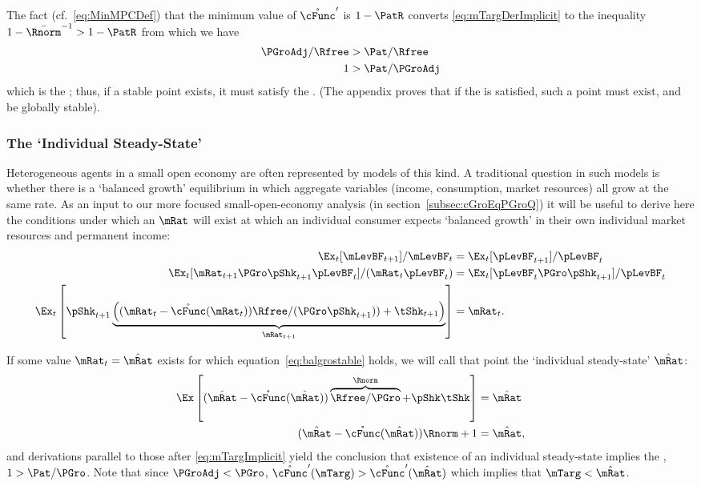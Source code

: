 \documentclass[BufferStockTheory]{subfiles}
\begin{document}
 The fact (cf.\ \eqref{eq:MinMPCDef}) that the minimum value of $\mathring{\cFunc}^{\prime}$ is $1-\PatR$ converts \eqref{eq:mTargDerImplicit} to the inequality $1-\bar{\Rnorm}^{-1} > 1-\PatR$ from which we have
 \begin{align}
      \PGroAdj/\Rfree & > \Pat/\Rfree \notag
\\    1 & > \Pat/\PGroAdj
 \end{align}
which is the {\GICNrm}; thus, if a stable point exists, it must satisfy the {\GICNrm}.  (The appendix proves that if the {\GICNrm} is satisfied, such a point must exist, and be globally stable).

 \hypertarget{The-Individual-Steady-State}{}
 \subsubsection{The `Individual Steady-State'}\label{subsubsec:mSteadyState}
 
Heterogeneous agents in a small open economy are often represented by models of this kind.  A traditional question in such models is whether there is a `balanced growth' equilibrium in which aggregate variables (income, consumption, market resources) all grow at the same rate. 
As an input to our more focused small-open-economy analysis (in section~\ref{subsec:cGroEqPGroQ}) it will be useful to derive here the conditions under which an $\mRat$ will exist at which an individual consumer expects `balanced growth' in their own individual market resources and permanent income:
  \begin{align}
  \Ex_{t}[\mLevBF_{t+1}]/\mLevBF_{t} & =\Ex_{t}[\pLevBF_{t+1}]/\pLevBF_{t} \notag
    \\  \Ex_{t}[\mRat_{t+1}\PGro\pShk_{t+1}\pLevBF_{t}]/(\mRat_{t}\pLevBF_{t}) & =\Ex_{t}[\pLevBF_{t}\PGro\pShk_{t+1}]/\pLevBF_{t} \notag
\\ \Ex_{t}\left[\pShk_{t+1}\underbrace{\left((\mRat_{t}-\mathring{\cFunc}(\mRat_{t}))\Rfree/(\PGro\pShk_{t+1}))+\tShk_{t+1}\right)}_{\mRat_{t+1}}\right] & = \mRat_{t} \label{eq:balgrostable}.  
\end{align}

\hypertarget{balgrostableSolve}{}
If some value $\mRat_{t}=\hat{\mRat}$ exists for which equation~\eqref{eq:balgrostable} holds, we will call that point the `individual steady-state' $\mBal$:
\begin{align}
  \Ex\left[(\mBal-\mathring{\cFunc}(\mBal))\overbrace{\Rfree/\PGro}^{\Rnorm}+\pShk\tShk\right] & = \mBal \notag
\\  (\mBal-\mathring{\cFunc}(\mBal))\Rnorm+ 1 & = \mBal \label{eq:balgrostableSolve},  
\end{align}
and derivations parallel to those after \eqref{eq:mTargImplicit} yield the conclusion that existence of an individual steady-state implies the {\GIC}, $1 > \Pat/\PGro$.  Note that since $\PGroAdj < \PGro$, $\mathring{\cFunc}^{\prime}(\mTarg) > \mathring{\cFunc}^{\prime}(\mBal)$ which implies that $\mTarg < \mBal$.
\end{document}

